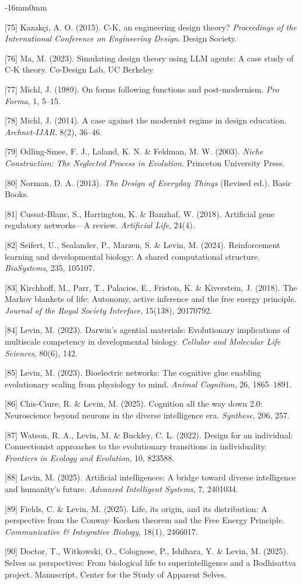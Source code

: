 \documentclass[10pt,oneside]{book}
\newcommand{\refentry}[1]{%
  \par\addvspace{0pt}%
  \begingroup\footnotesize\linespread{0.92}\selectfont
  \noindent\hangindent=4mm\hangafter=1 #1\par%
  \endgroup
}
\newenvironment{widebody}{%
  \begin{adjustwidth}{-16mm}{0mm}%
}{%
  \end{adjustwidth}%
}
\begin{document}
\begin{widebody}
\refentry{[75] Kazakçi, A. O. (2015). C-K, an engineering design theory? \textit{Proceedings of the International Conference on Engineering Design}. Design Society.}
\refentry{[76] Ma, M. (2023). Simulating design theory using LLM agents: A case study of C-K theory. Co-Design Lab, UC Berkeley.}
\refentry{[77] Michl, J. (1989). On forms following functions and post-modernism. \textit{Pro Forma}, 1, 5--15.}
\refentry{[78] Michl, J. (2014). A case against the modernist regime in design education. \textit{Archnet-IJAR}, 8(2), 36--46.}
\refentry{[79] Odling-Smee, F. J., Laland, K. N. \& Feldman, M. W. (2003). \textit{Niche Construction: The Neglected Process in Evolution}. Princeton University Press.}
\refentry{[80] Norman, D. A. (2013). \textit{The Design of Everyday Things} (Revised ed.). Basic Books.}
\refentry{[81] Cussat-Blanc, S., Harrington, K. \& Banzhaf, W. (2018). Artificial gene regulatory networks---A review. \textit{Artificial Life}, 24(4).}
\refentry{[82] Seifert, U., Sealander, P., Marzen, S. \& Levin, M. (2024). Reinforcement learning and developmental biology: A shared computational structure. \textit{BioSystems}, 235, 105107.}
\refentry{[83] Kirchhoff, M., Parr, T., Palacios, E., Friston, K. \& Kiverstein, J. (2018). The Markov blankets of life: Autonomy, active inference and the free energy principle. \textit{Journal of the Royal Society Interface}, 15(138), 20170792.}
\refentry{[84] Levin, M. (2023). Darwin's agential materials: Evolutionary implications of multiscale competency in developmental biology. \textit{Cellular and Molecular Life Sciences}, 80(6), 142.}
\refentry{[85] Levin, M. (2023). Bioelectric networks: The cognitive glue enabling evolutionary scaling from physiology to mind. \textit{Animal Cognition}, 26, 1865--1891.}
\refentry{[86] Chis-Ciure, R. \& Levin, M. (2025). Cognition all the way down 2.0: Neuroscience beyond neurons in the diverse intelligence era. \textit{Synthese}, 206, 257.}
\refentry{[87] Watson, R. A., Levin, M. \& Buckley, C. L. (2022). Design for an individual: Connectionist approaches to the evolutionary transitions in individuality. \textit{Frontiers in Ecology and Evolution}, 10, 823588.}
\refentry{[88] Levin, M. (2025). Artificial intelligences: A bridge toward diverse intelligence and humanity's future. \textit{Advanced Intelligent Systems}, 7, 2401034.}
\refentry{[89] Fields, C. \& Levin, M. (2025). Life, its origin, and its distribution: A perspective from the Conway--Kochen theorem and the Free Energy Principle. \textit{Communicative \& Integrative Biology}, 18(1), 2466017.}
\refentry{[90] Doctor, T., Witkowski, O., Colognese, P., Ishihara, Y. \& Levin, M. (2025). Selves as perspectives: From biological life to superintelligence and a Bodhisattva project. Manuscript, Center for the Study of Apparent Selves.}

\end{widebody}
\end{document}
